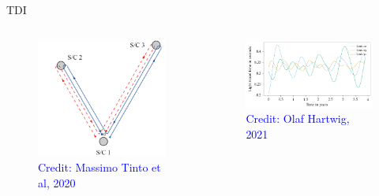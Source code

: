 \documentclass[pdf]{beamer}
\newcommand{\credit}[1]{\tiny{\textcolor{blue}{Credit: #1}}}
\begin{document}
\begin{frame}{TDI}
\begin{columns}
\begin{figure}
\includegraphics[scale=.15]{fig/LISAschem.png}
\caption*{\credit{Massimo Tinto et al, 2020}}
\end{figure}
\begin{figure}
\includegraphics[scale=.15]{fig/Distance.png}
\caption*{\credit{Olaf Hartwig, 2021}}
\end{figure}
\end{columns}
\end{frame}
\end{document}
